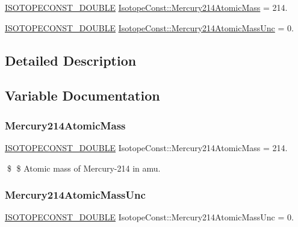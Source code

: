 \begin{DoxyCompactItemize}
\item 
\mbox{\hyperlink{group___isotope_const-_macros_ga8f45a7272ce02c0b4c65c44636ed719a}{I\+S\+O\+T\+O\+P\+E\+C\+O\+N\+S\+T\+\_\+\+D\+O\+U\+B\+LE}} \mbox{\hyperlink{group___isotope_const-_mercury-_hg214_ga80e2be7d158c126d1ce8fef8a755f68e}{Isotope\+Const\+::\+Mercury214\+Atomic\+Mass}} = 214.
\item 
\mbox{\hyperlink{group___isotope_const-_macros_ga8f45a7272ce02c0b4c65c44636ed719a}{I\+S\+O\+T\+O\+P\+E\+C\+O\+N\+S\+T\+\_\+\+D\+O\+U\+B\+LE}} \mbox{\hyperlink{group___isotope_const-_mercury-_hg214_ga4569ee4f564414be98ba696a016b5ebc}{Isotope\+Const\+::\+Mercury214\+Atomic\+Mass\+Unc}} = 0.
\end{DoxyCompactItemize}


\subsection{Detailed Description}


\subsection{Variable Documentation}
\mbox{\label{group___isotope_const-_mercury-_hg214_ga80e2be7d158c126d1ce8fef8a755f68e}} 
\subsubsection{\texorpdfstring{Mercury214\+Atomic\+Mass}{Mercury214AtomicMass}}
{\footnotesize\ttfamily \mbox{\hyperlink{group___isotope_const-_macros_ga8f45a7272ce02c0b4c65c44636ed719a}{I\+S\+O\+T\+O\+P\+E\+C\+O\+N\+S\+T\+\_\+\+D\+O\+U\+B\+LE}} Isotope\+Const\+::\+Mercury214\+Atomic\+Mass = 214.}

\$ \$ Atomic mass of Mercury-\/214 in amu. \mbox{\label{group___isotope_const-_mercury-_hg214_ga4569ee4f564414be98ba696a016b5ebc}} 
\subsubsection{\texorpdfstring{Mercury214\+Atomic\+Mass\+Unc}{Mercury214AtomicMassUnc}}
{\footnotesize\ttfamily \mbox{\hyperlink{group___isotope_const-_macros_ga8f45a7272ce02c0b4c65c44636ed719a}{I\+S\+O\+T\+O\+P\+E\+C\+O\+N\+S\+T\+\_\+\+D\+O\+U\+B\+LE}} Isotope\+Const\+::\+Mercury214\+Atomic\+Mass\+Unc = 0.}

